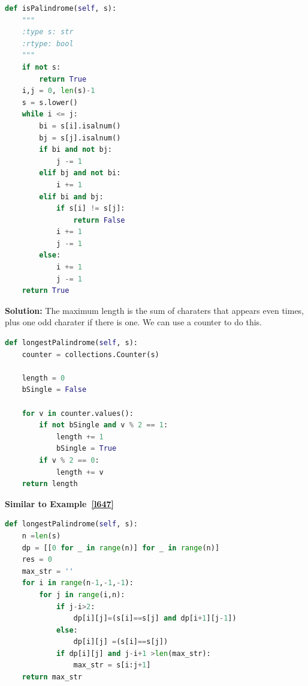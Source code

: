 \documentclass[../main.tex]{subfiles}
\begin{document}
        \begin{Answer}[ref={Palindrome}]
        \Question %
\begin{lstlisting}[language=Python]
def isPalindrome(self, s):
    """
    :type s: str
    :rtype: bool
    """
    if not s:
        return True
    i,j = 0, len(s)-1
    s = s.lower()
    while i <= j:
        bi = s[i].isalnum() 
        bj = s[j].isalnum()
        if bi and not bj:
            j -= 1
        elif bj and not bi:
            i += 1
        elif bi and bj:
            if s[i] != s[j]:
                return False
            i += 1
            j -= 1
        else:
            i += 1
            j -= 1
    return True
\end{lstlisting}
\Question
\textbf{Solution:} The maximum length is the sum of charaters that appears even times, plus one odd charater if there is one. We can use a counter to do this. 
\begin{lstlisting}[language=Python]
def longestPalindrome(self, s):
    counter = collections.Counter(s)
        
    length = 0
    bSingle = False
        
    for v in counter.values():
        if not bSingle and v % 2 == 1:
            length += 1
            bSingle = True
        if v % 2 == 0:
            length += v
    return length
\end{lstlisting}
            \Question 
\textbf{Similar to Example~\ref{l647}}

\begin{lstlisting}[language=Python]
def longestPalindrome(self, s):
    n =len(s)
    dp = [[0 for _ in range(n)] for _ in range(n)]
    res = 0
    max_str = ''
    for i in range(n-1,-1,-1):
        for j in range(i,n):               
            if j-i>2:
                dp[i][j]=(s[i]==s[j] and dp[i+1][j-1])
            else:
                dp[i][j] =(s[i]==s[j])
            if dp[i][j] and j-i+1 >len(max_str):
                max_str = s[i:j+1]
    return max_str
\end{lstlisting}
        \end{Answer}
\end{document}
